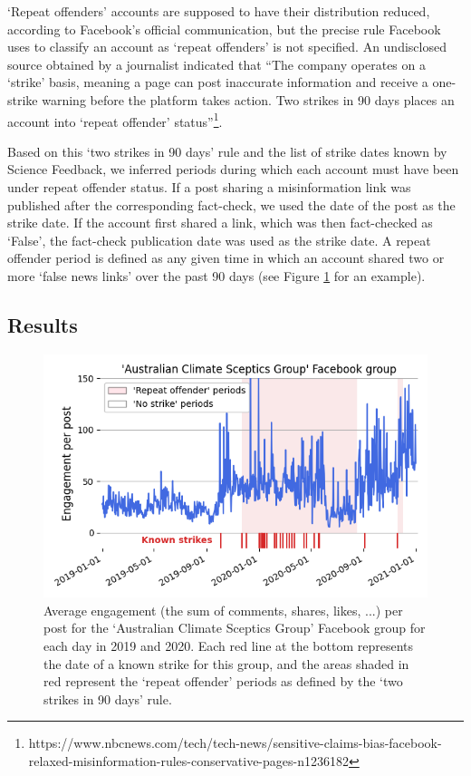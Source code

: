 \documentclass[11pt,a4paper]{article}
\begin{document}
`Repeat offenders' accounts are supposed to have their distribution reduced, according to Facebook's official communication, but the precise rule Facebook uses to classify an account as `repeat offenders' is not specified. 
An undisclosed source obtained by a journalist indicated that ``The company operates on a `strike' basis, meaning a page can post inaccurate information and receive a one-strike warning before the platform takes action. 
Two strikes in 90 days places an account into `repeat offender' status''\footnote{https://www.nbcnews.com/tech/tech-news/sensitive-claims-bias-facebook-relaxed-misinformation-rules-conservative-pages-n1236182}.

Based on this `two strikes in 90 days' rule and the list of strike dates known by Science Feedback, we inferred periods during which each account must have been under repeat offender status. 
If a post sharing a misinformation link was published after the corresponding fact-check, we used the date of the post as the strike date. 
If the account first shared a link, which was then fact-checked as `False', the fact-check publication date was used as the strike date. 
A repeat offender period is defined as any given time in which an account shared two or more `false news links' over the past 90 days (see Figure \ref{repeat_example_timeseries} for an example).

\subsection{Results}

\begin{figure}[!h]
\centering
\includegraphics[width=\linewidth]{./../figure/repeat_example_timeseries.png}
\caption{Average engagement (the sum of comments, shares, likes, ...) per post for the `Australian Climate Sceptics Group' Facebook group for each day in 2019 and 2020. Each red line at the bottom represents the date of a known strike for this group, and the areas shaded in red represent the `repeat offender' periods as defined by the ‘two strikes in 90 days’ rule.}
\label{repeat_example_timeseries}
\end{figure}
\end{document}
